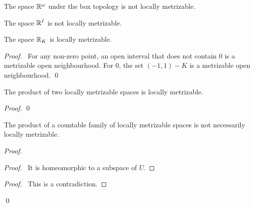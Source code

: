 \begin{corollary}
    The space $\mathbb{R}^\omega$ under the box topology is not locally metrizable.
\end{corollary}

\begin{corollary}
    The space $\mathbb{R}^I$ is not locally metrizable.
\end{corollary}

\begin{proposition}
    The space $\mathbb{R}_K$ is locally metrizable.
\end{proposition}

\begin{proof}
    \pf\ For any non-zero point, an open interval that does not contain 0 is a metrizable
    open neighbourhood. For 0, the set $(-1,1) - K$ is a metrizable open neighbourhood. \qed
\end{proof}

\begin{proposition}
    The product of two locally metrizable spaces is locally metrizable.
\end{proposition}

\begin{proof}
    \pf
    \qed
\end{proof}

\begin{proposition}
    The product of a countable family of locally metrizable spaces is
    not necessarily locally metrizable.
\end{proposition}

\begin{proof}
    \pf
    \begin{proof}
        \pf\ It is homeomorphic to a subspace of $U$.
    \end{proof}
    \qedstep
    \begin{proof}
        \pf\ This is a contradiction.
    \end{proof}
    \qed
\end{proof}

